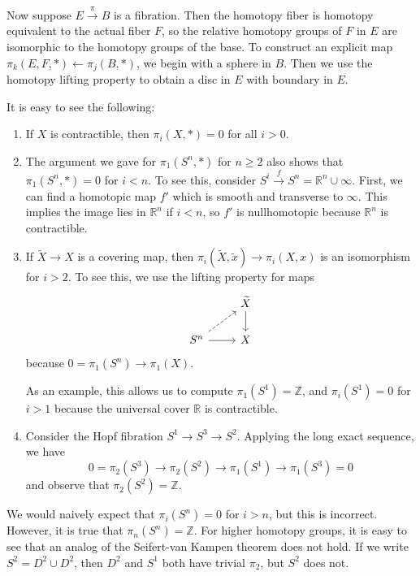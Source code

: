 \documentclass[leqno, openany]{memoir}
\theoremstyle{definition}
\theoremstyle{remark}
\theoremstyle{plain}
\theoremstyle{definition}
\theoremstyle{remark}
\newcommand{\R}{\mathbb{R}}
\newcommand{\Z}{\mathbb{Z}}
\newcommand{\wt}[1]{\widetilde{#1}}
\begin{document}
Now suppose $E \xrightarrow{\pi} B$ is a fibration. Then the homotopy fiber is
homotopy equivalent to the actual fiber $F$, so the relative homotopy groups of
$F$ in $E$ are isomorphic to the homotopy groups of the base. To construct an
explicit map $\pi_k(E,F,*) \gets \pi_j(B,*)$, we begin with a sphere in $B$.
Then we use the homotopy lifting property to obtain a disc in $E$ with boundary
in $E$.

It is easy to see the following: \begin{enumerate} \item If $X$ is
    contractible, then $\pi_i(X,*) = 0$ for all $i > 0$.  \item The argument we
    gave for $\pi_1(S^n, *)$ for $n \geq 2$ also shows that $\pi_1(S^n, *) = 0$
    for $i < n$. To see this, consider $S^i \xrightarrow{f} S^n = \R^n \cup
    \infty$. First, we can find a homotopic map $f'$ which is smooth and
    transverse to $\infty$. This implies the image lies in $\R^n$ if $i < n$,
    so $f'$ is nullhomotopic because $\R^n$ is contractible.  \item If $\wt{X}
    \to X$ is a covering map, then $\pi_i(\wt{X}, \wt{x}) \to \pi_i(X,x)$ is an
    isomorphism for $i > 2$. To see this, we use the lifting property for maps
    \begin{equation*} \begin{tikzcd} & \wt{X} \arrow{d} \\ S^n \arrow{r}
    \arrow[dashrightarrow]{ur} & X \end{tikzcd} \end{equation*} because $0 =
    \pi_1(S^n) \to \pi_1(X)$. 

        As an example, this allows us to compute $\pi_1(S^1) = \Z$, and
        $\pi_i(S^1) = 0$ for $i > 1$ because the universal cover $\R$ is
        contractible.  \item Consider the Hopf fibration $S^1 \to S^3 \to S^2$.
        Applying the long exact sequence, we have \[ 0 = \pi_2(S^3) \to
    \pi_2(S^2) \to \pi_1(S^1) \to \pi_1(S^3) = 0 \] and observe that
    $\pi_2(S^2) = \Z$.  \end{enumerate}

We would naively expect that $\pi_i(S^n) = 0$ for $i > n$, but this is
incorrect. However, it is true that $\pi_n(S^n) = \Z$. For higher homotopy
groups, it is easy to see that an analog of the Seifert-van Kampen theorem does
not hold. If we write $S^2 = D^2 \cup D^2$, then $D^2$ and $S^1$ both have
trivial $\pi_2$, but $S^2$ does not.
\end{document}
